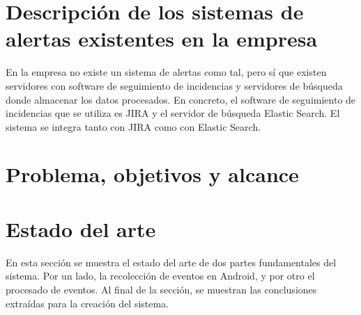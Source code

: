 \section{Descripción de los sistemas de alertas existentes en la empresa}
En la empresa no existe un sistema de alertas como tal, pero sí que existen servidores con software de seguimiento de incidencias y servidores de búsqueda donde almacenar los datos procesados. En concreto, el software de seguimiento de incidencias que se utiliza es JIRA\cite{Tfg:jira} y el servidor de búsqueda Elastic Search\cite{Tfg:elasticsearch}. El sistema se integra tanto con JIRA como con Elastic Search.

\section{Problema, objetivos y alcance}



\section{Estado del arte}
En esta sección se muestra el estado del arte de dos partes fundamentales del sistema. Por un lado, la recolección de eventos en Android, y por otro el procesado de eventos. Al final de la sección, se muestran las conclusiones extraídas para la creación del sistema.

